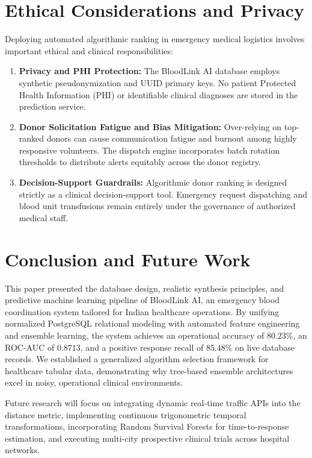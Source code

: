 \documentclass[conference]{IEEEtran}
\begin{document}
\section{Ethical Considerations and Privacy}
Deploying automated algorithmic ranking in emergency medical logistics involves important ethical and clinical responsibilities:
\begin{enumerate}
    \item \textbf{Privacy and PHI Protection:} The BloodLink AI database employs synthetic pseudonymization and UUID primary keys. No patient Protected Health Information (PHI) or identifiable clinical diagnoses are stored in the prediction service.
    \item \textbf{Donor Solicitation Fatigue and Bias Mitigation:} Over-relying on top-ranked donors can cause communication fatigue and burnout among highly responsive volunteers. The dispatch engine incorporates batch rotation thresholds to distribute alerts equitably across the donor registry.
    \item \textbf{Decision-Support Guardrails:} Algorithmic donor ranking is designed strictly as a clinical decision-support tool. Emergency request dispatching and blood unit transfusions remain entirely under the governance of authorized medical staff.
\end{enumerate}

\section{Conclusion and Future Work}
This paper presented the database design, realistic synthesis principles, and predictive machine learning pipeline of BloodLink AI, an emergency blood coordination system tailored for Indian healthcare operations. By unifying normalized PostgreSQL relational modeling with automated feature engineering and ensemble learning, the system achieves an operational accuracy of $80.23\%$, an ROC-AUC of $0.8713$, and a positive response recall of $85.48\%$ on live database records. We established a generalized algorithm selection framework for healthcare tabular data, demonstrating why tree-based ensemble architectures excel in noisy, operational clinical environments.

Future research will focus on integrating dynamic real-time traffic APIs into the distance metric, implementing continuous trigonometric temporal transformations, incorporating Random Survival Forests for time-to-response estimation, and executing multi-city prospective clinical trials across hospital networks.
\end{document}
